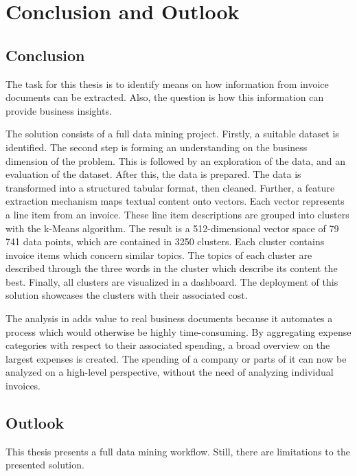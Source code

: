 \chapter{Conclusion and Outlook}
\section{Conclusion}

The task for this thesis is to identify means on how information from invoice documents can be extracted. Also, the question is how this information can provide business insights.

The solution consists of a full data mining project. Firstly, a suitable dataset is identified. The second step is forming an understanding on the business dimension of the problem. This is followed by an exploration of the data, and an evaluation of the dataset. After this, the data is prepared. The data is transformed into a structured tabular format, then cleaned. Further, a feature extraction mechanism maps textual content onto vectors. Each vector represents a line item from an invoice. These line item descriptions are grouped into clusters with the k-Means algorithm. The result is a 512-dimensional vector space of 79 741 data points, which are contained in 3250 clusters. Each cluster contains invoice items which concern similar topics. The topics of each cluster are described through the three words in the cluster which describe its content the best. Finally, all clusters are visualized in a dashboard. The deployment of this solution showcases the clusters with their associated cost. 

The analysis in adds value to real business documents because it automates a process which would otherwise be highly time-consuming. By aggregating expense categories with respect to their associated spending, a broad overview on the largest expenses is created. The spending of a company or parts of it can now be analyzed on a high-level perspective, without the need of analyzing individual invoices.

\section{Outlook}

This thesis presents a full data mining workflow. Still, there are limitations to the presented solution.


